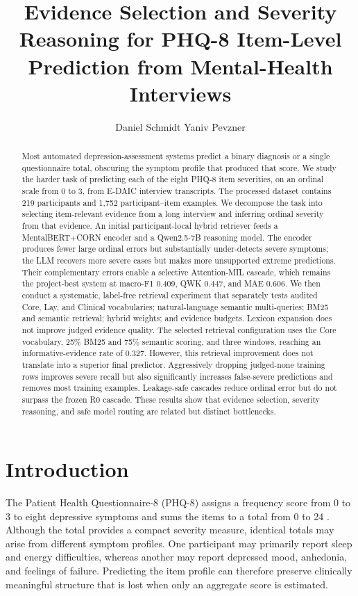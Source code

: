 \documentclass{article}
\title{Evidence Selection and Severity Reasoning for PHQ-8 Item-Level Prediction from Mental-Health Interviews}
\author{%
  Daniel Schmidt
  \And
  Yaniv Pevzner
}
\begin{document}
\maketitle

\begin{abstract}
Most automated depression-assessment systems predict a binary diagnosis or a single questionnaire total, obscuring the symptom profile that produced that score. We study the harder task of predicting each of the eight PHQ-8 item severities, on an ordinal scale from 0 to 3, from E-DAIC interview transcripts. The processed dataset contains 219 participants and 1,752 participant--item examples. We decompose the task into selecting item-relevant evidence from a long interview and inferring ordinal severity from that evidence. An initial participant-local hybrid retriever feeds a MentalBERT+CORN encoder and a Qwen2.5-7B reasoning model. The encoder produces fewer large ordinal errors but substantially under-detects severe symptoms; the LLM recovers more severe cases but makes more unsupported extreme predictions. Their complementary errors enable a selective Attention-MIL cascade, which remains the project-best system at macro-F1 0.409, QWK 0.447, and MAE 0.606. We then conduct a systematic, label-free retrieval experiment that separately tests audited Core, Lay, and Clinical vocabularies; natural-language semantic multi-queries; BM25 and semantic retrieval; hybrid weights; and evidence budgets. Lexicon expansion does not improve judged evidence quality. The selected retrieval configuration uses the Core vocabulary, 25\% BM25 and 75\% semantic scoring, and three windows, reaching an informative-evidence rate of 0.327. However, this retrieval improvement does not translate into a superior final predictor. Aggressively dropping judged-none training rows improves severe recall but also significantly increases false-severe predictions and removes most training examples. Leakage-safe cascades reduce ordinal error but do not surpass the frozen R0 cascade. These results show that evidence selection, severity reasoning, and safe model routing are related but distinct bottlenecks.
\end{abstract}

\section{Introduction}
\label{sec:introduction}
The Patient Health Questionnaire-8 (PHQ-8) assigns a frequency score from 0 to 3 to eight depressive symptoms and sums the items to a total from 0 to 24 \cite{kroenke2009phq8}. Although the total provides a compact severity measure, identical totals may arise from different symptom profiles. One participant may primarily report sleep and energy difficulties, whereas another may report depressed mood, anhedonia, and feelings of failure. Predicting the item profile can therefore preserve clinically meaningful structure that is lost when only an aggregate score is estimated.
\end{document}
